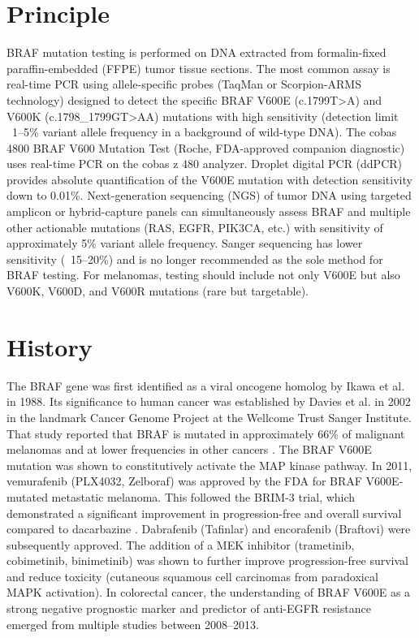 \section*{Principle}
BRAF mutation testing is performed on DNA extracted from formalin-fixed paraffin-embedded (FFPE) tumor tissue sections. The most common assay is real-time PCR using allele-specific probes (TaqMan or Scorpion-ARMS technology) designed to detect the specific BRAF V600E (c.1799T>A) and V600K (c.1798\_1799GT>AA) mutations with high sensitivity (detection limit ~1--5\% variant allele frequency in a background of wild-type DNA). The cobas 4800 BRAF V600 Mutation Test (Roche, FDA-approved companion diagnostic) uses real-time PCR on the cobas z 480 analyzer. Droplet digital PCR (ddPCR) provides absolute quantification of the V600E mutation with detection sensitivity down to 0.01\%. Next-generation sequencing (NGS) of tumor DNA using targeted amplicon or hybrid-capture panels can simultaneously assess BRAF and multiple other actionable mutations (RAS, EGFR, PIK3CA, etc.) with sensitivity of approximately 5\% variant allele frequency. Sanger sequencing has lower sensitivity (~15--20\%) and is no longer recommended as the sole method for BRAF testing. For melanomas, testing should include not only V600E but also V600K, V600D, and V600R mutations (rare but targetable).

\section*{History}
The BRAF gene was first identified as a viral oncogene homolog by Ikawa et al. in 1988. Its significance to human cancer was established by Davies et al. in 2002 in the landmark Cancer Genome Project at the Wellcome Trust Sanger Institute. That study reported that BRAF is mutated in approximately 66\% of malignant melanomas and at lower frequencies in other cancers \cite{davies2002mutations}. The BRAF V600E mutation was shown to constitutively activate the MAP kinase pathway. In 2011, vemurafenib (PLX4032, Zelboraf) was approved by the FDA for BRAF V600E-mutated metastatic melanoma. This followed the BRIM-3 trial, which demonstrated a significant improvement in progression-free and overall survival compared to dacarbazine \cite{chapman2011improved}. Dabrafenib (Tafinlar) and encorafenib (Braftovi) were subsequently approved. The addition of a MEK inhibitor (trametinib, cobimetinib, binimetinib) was shown to further improve progression-free survival and reduce toxicity (cutaneous squamous cell carcinomas from paradoxical MAPK activation). In colorectal cancer, the understanding of BRAF V600E as a strong negative prognostic marker and predictor of anti-EGFR resistance emerged from multiple studies between 2008--2013.

